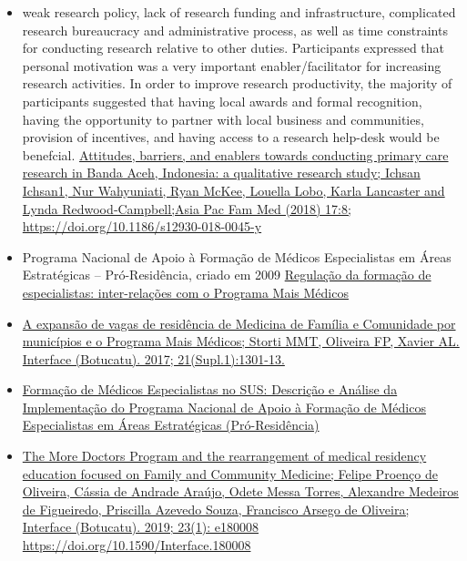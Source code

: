 \documentclass[]{book}
\begin{document}
\begin{itemize}
\item
  weak research policy, lack of research funding and infrastructure, complicated research bureaucracy and administrative process, as well as time constraints for conducting research relative to other duties. Participants expressed that personal motivation was a very important enabler/facilitator for increasing research activities. In order to improve research productivity, the majority of participants suggested that having local awards and formal recognition, having the opportunity to partner with local business and communities, provision of incentives, and having access to a research help-desk would be benefcial. \href{https://www.ncbi.nlm.nih.gov/pmc/articles/PMC6064079/pdf/12930_2018_Article_45.pdf}{Attitudes, barriers, and enablers towards conducting primary care research in Banda Aceh, Indonesia: a qualitative research study; Ichsan Ichsan1, Nur Wahyuniati, Ryan McKee, Louella Lobo, Karla Lancaster and Lynda Redwood‑Campbell;Asia Pac Fam Med (2018) 17:8; https://doi.org/10.1186/s12930-018-0045-y}
\item
  Programa Nacional de Apoio à Formação de Médicos Especialistas em Áreas Estratégicas -- Pró-Residência, criado em 2009 \href{http://www.scielo.br/pdf/physis/v26n2/0103-7331-physis-26-02-00633.pdf}{Regulação da formação de especialistas: inter-relações com o Programa Mais Médicos}
\item
  \href{http://www.scielo.br/pdf/icse/v21s1/1807-5762-icse-21-s1-1301.pdf}{A expansão de vagas de residência de Medicina de Família e Comunidade por municípios e o Programa Mais Médicos; Storti MMT, Oliveira FP, Xavier AL. Interface (Botucatu). 2017; 21(Supl.1):1301-13.}
\item
  \href{http://www.scielo.br/pdf/rbem/v37n1/11.pdf}{Formação de Médicos Especialistas no SUS: Descrição e Análise da Implementação do Programa Nacional de Apoio à Formação de Médicos Especialistas em Áreas Estratégicas (Pró-Residência)}
\item
  \href{http://www.scielo.br/pdf/icse/v23s1/1807-5762-icse-23-s1-e180008.pdf}{The More Doctors Program and the rearrangement of medical residency education focused on Family and Community Medicine; Felipe Proenço de Oliveira, Cássia de Andrade Araújo, Odete Messa Torres, Alexandre Medeiros de Figueiredo, Priscilla Azevedo Souza, Francisco Arsego de Oliveira; Interface (Botucatu). 2019; 23(1): e180008 https://doi.org/10.1590/Interface.180008}
\end{itemize}
\end{document}
